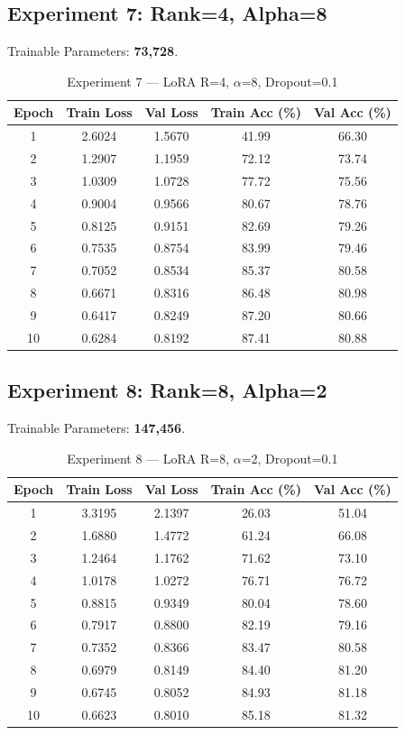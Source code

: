 \documentclass[12pt,a4paper]{article}
\begin{document}
\subsection{Experiment 7: Rank=4, Alpha=8}
Trainable Parameters: \textbf{73,728}.

\begin{table}[H]
\centering
\caption{Experiment 7 --- LoRA R=4, $\alpha$=8, Dropout=0.1}
\small
\begin{tabular}{ccccc}
\toprule
Epoch & Train Loss & Val Loss & Train Acc (\%) & Val Acc (\%) \\
\midrule
1  & 2.6024 & 1.5670 & 41.99 & 66.30 \\
2  & 1.2907 & 1.1959 & 72.12 & 73.74 \\
3  & 1.0309 & 1.0728 & 77.72 & 75.56 \\
4  & 0.9004 & 0.9566 & 80.67 & 78.76 \\
5  & 0.8125 & 0.9151 & 82.69 & 79.26 \\
6  & 0.7535 & 0.8754 & 83.99 & 79.46 \\
7  & 0.7052 & 0.8534 & 85.37 & 80.58 \\
8  & 0.6671 & 0.8316 & 86.48 & 80.98 \\
9  & 0.6417 & 0.8249 & 87.20 & 80.66 \\
10 & 0.6284 & 0.8192 & 87.41 & 80.88 \\
\bottomrule
\end{tabular}
\end{table}

\subsection{Experiment 8: Rank=8, Alpha=2}
Trainable Parameters: \textbf{147,456}.

\begin{table}[H]
\centering
\caption{Experiment 8 --- LoRA R=8, $\alpha$=2, Dropout=0.1}
\small
\begin{tabular}{ccccc}
\toprule
Epoch & Train Loss & Val Loss & Train Acc (\%) & Val Acc (\%) \\
\midrule
1  & 3.3195 & 2.1397 & 26.03 & 51.04 \\
2  & 1.6880 & 1.4772 & 61.24 & 66.08 \\
3  & 1.2464 & 1.1762 & 71.62 & 73.10 \\
4  & 1.0178 & 1.0272 & 76.71 & 76.72 \\
5  & 0.8815 & 0.9349 & 80.04 & 78.60 \\
6  & 0.7917 & 0.8800 & 82.19 & 79.16 \\
7  & 0.7352 & 0.8366 & 83.47 & 80.58 \\
8  & 0.6979 & 0.8149 & 84.40 & 81.20 \\
9  & 0.6745 & 0.8052 & 84.93 & 81.18 \\
10 & 0.6623 & 0.8010 & 85.18 & 81.32 \\
\bottomrule
\end{tabular}
\end{table}
\end{document}
